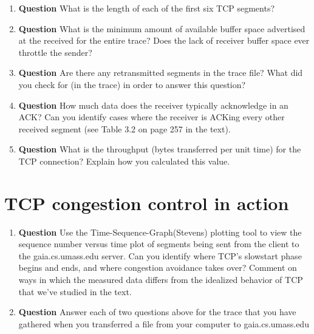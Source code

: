 \documentclass[12pt,letterpaper]{article}
\newcommand{\q}{\textbf{Question} }
\begin{document}
\begin{enumerate}[resume]
\item \q What is the length of each of the first six TCP segments?

\item \q What is the minimum amount of available buffer space advertised at the
received for the entire trace?  Does the lack of receiver buffer space ever
throttle the sender?  

\item \q Are there any retransmitted segments in the trace file? What did you
check for (in the trace) in order to answer this question?  

\item \q How much data does the receiver typically acknowledge in an ACK?  Can
you identify cases where the receiver is ACKing every other received segment
(see Table 3.2 on page 257 in the text).  

\item \q What is the throughput (bytes transferred per unit time) for the TCP
connection?  Explain how you calculated this value.  
\end{enumerate}


\section{TCP congestion control in action}
\begin{enumerate}[resume]
\item \q Use the Time-Sequence-Graph(Stevens) plotting tool to view the
sequence number versus time plot of segments being sent from the client to the
gaia.cs.umass.edu server.  Can you identify where TCP’s slowstart phase begins
and ends, and where congestion avoidance takes over?  Comment on ways in which
the measured data differs from the idealized behavior of TCP that we’ve studied
in the text. 

\item \q Answer each of two questions above for the trace that you have
gathered when you transferred a file from your computer to gaia.cs.umass.edu 

\end{enumerate}
\end{document}
